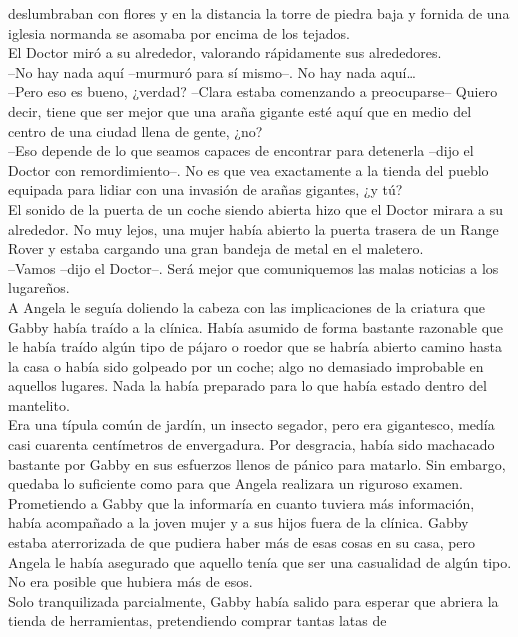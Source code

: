{deslumbraban con flores y en la distancia la torre de piedra baja y
fornida de una iglesia normanda se asomaba por encima de los tejados.\\
El Doctor miró a su alrededor, valorando rápidamente sus alrededores.\\
--No hay nada aquí --murmuró para sí mismo--. No hay nada aquí\ldots{}\\
--Pero eso es bueno, ¿verdad? --Clara estaba comenzando a preocuparse--
Quiero decir, tiene que ser mejor que una araña gigante esté aquí que en
medio del centro de una ciudad llena de gente, ¿no?\\
--Eso depende de lo que seamos capaces de encontrar para detenerla
--dijo el Doctor con remordimiento--. No es que vea exactamente a la
tienda del pueblo equipada para lidiar con una invasión de arañas
gigantes, ¿y tú?\\
El sonido de la puerta de un coche siendo abierta hizo que el Doctor
mirara a su alrededor. No muy lejos, una mujer había abierto la puerta
trasera de un Range Rover y estaba cargando una gran bandeja de metal en
el maletero.\\
--Vamos --dijo el Doctor--. Será mejor que comuniquemos las malas
noticias a los lugareños.\\[2\baselineskip]A Angela le seguía doliendo
la cabeza con las implicaciones de la criatura que Gabby había traído a
la clínica. Había asumido de forma bastante razonable que le había
traído algún tipo de pájaro o roedor que se habría abierto camino hasta
la casa o había sido golpeado por un coche; algo no demasiado improbable
en aquellos lugares. Nada la había preparado para lo que había estado
dentro del mantelito.\\
Era una típula común de jardín, un insecto segador, pero era gigantesco,
medía casi cuarenta centímetros de envergadura. Por desgracia, había
sido machacado bastante por Gabby en sus esfuerzos llenos de pánico para
matarlo. Sin embargo, quedaba lo suficiente como para que Angela
realizara un riguroso examen.\\
Prometiendo a Gabby que la informaría en cuanto tuviera más información,
había acompañado a la joven mujer y a sus hijos fuera de la clínica.
Gabby estaba aterrorizada de que pudiera haber más de esas cosas en su
casa, pero Angela le había asegurado que aquello tenía que ser una
casualidad de algún tipo. No era posible que hubiera más de esos.\\
Solo tranquilizada parcialmente, Gabby había salido para esperar que
abriera la tienda de herramientas, pretendiendo comprar tantas latas de
}
